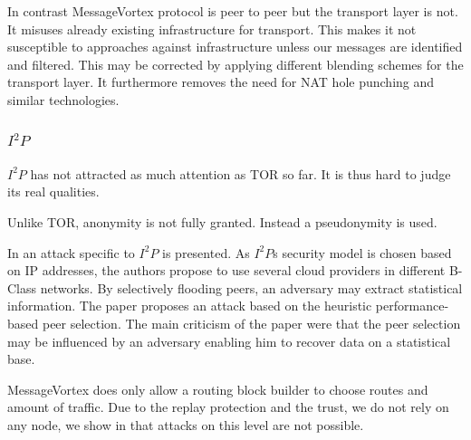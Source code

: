 \documentclass[9pt,journal,compsoc]{IEEEtran}
\begin{document}
In contrast MessageVortex protocol is peer to peer but the transport layer is not. It misuses already existing infrastructure for transport. This makes it not susceptible to approaches against infrastructure unless our messages are identified and filtered. This may be corrected by applying different blending schemes for the transport layer. It furthermore removes the need for NAT hole punching and similar technologies.

\subsubsection{$I^2P$}
%
$I^2P$ has not attracted as much attention as TOR so far. It is thus hard to judge its real qualities. 

Unlike TOR, anonymity is not fully granted. Instead a pseudonymity is used. 

In \cite{pets2011-i2p} an attack specific to $I^2P$ is presented. As $I^2P$s security model is chosen based on IP addresses, the authors propose to use several cloud providers in different B-Class networks. By selectively flooding peers, an adversary may extract statistical information. The paper proposes an attack based on the heuristic performance-based peer selection. The main criticism of the paper were that the peer selection may be influenced by an adversary enabling him to recover data on a statistical base.

MessageVortex does only allow a routing block builder to choose routes and amount of traffic. Due to the replay protection and the trust, we do not rely on any node, we show in \cite{messageVortex} that attacks on this level are not possible.
\end{document}
